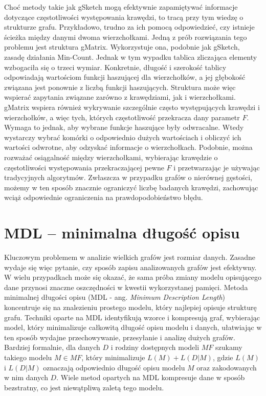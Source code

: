     Choć metody takie jak gSketch mogą efektywnie zapamiętywać informacje dotyczące częstotliwości występowania krawędzi, to tracą przy tym wiedzę o strukturze grafu. Przykładowo, trudno za ich pomocą odpowiedzieć, czy istnieje ścieżka między danymi dwoma wierzchołkami. Jedną z prób rozwiązania tego problemu jest struktura gMatrix\cite{Khan_Aggarwal_2016}. Wykorzystuje ona, podobnie jak gSketch, zasadę działania Min-Count. Jednak w tym wypadku tablica zliczająca elementy wzbogaciła się o trzeci wymiar. Konkretnie, długość i szerokość tablicy odpowiadają wartościom funkcji haszującej dla wierzchołków, a jej głębokość związana jest ponownie z liczbą funkcji haszujących. Struktura może więc wspierać zapytania związane zarówno z krawędziami, jak i wierzchołkami. gMatrix wspiera również wykrywanie szczególnie często występujących krawędzi i wierzchołków, a więc tych, których częstotliwość przekracza dany parametr $F$. Wymaga to jednak, aby wybrane funkcje haszujące były odwracalne. Wtedy wystarczy wybrać komórki o odpowiednio dużych wartościach i obliczyć ich wartości odwrotne, aby odzyskać informacje o wierzchołkach. Podobnie, można rozważać osiągalność między wierzchołkami, wybierając krawędzie o częstotliwości występowania przekraczającej pewne $F$ i przetwarzając je używając tradycyjnych algorytmów. Zwłaszcza w przypadku grafów o nierównej gęstości, możemy w ten sposób znacznie ograniczyć liczbę badanych krawędzi, zachowując wciąż odpowiednie ograniczenia na prawdopodobieństwo błędu.

\section{MDL -- minimalna długość opisu}
    Kluczowym problemem w analizie wielkich grafów jest rozmiar danych. Zasadne wydaje się więc pytanie, czy sposób zapisu analizowanych grafów jest efektywny. W wielu przypadkach może się okazać, że sama próba zmiany modelu opisującego dane przynosi znaczne oszczędności w kwestii wykorzystanej pamięci. Metoda minimalnej długości opisu (MDL - ang. \textit{Minimum Description Length}) koncentruje się na znalezieniu prostego modelu, który najlepiej opisuje strukturę grafu. Techniki oparte na MDL identyfikują wzorce i kompresują graf, wybierając model, który minimalizuje całkowitą długość opisu modelu i danych, ułatwiając w ten sposób wydajne przechowywanie, przesyłanie i analizę dużych grafów. Bardziej formalnie, dla danych $D$ i rodziny dostępnych modeli $MF$ szukamy takiego modelu $M \in MF$, który minimalizuje $L(M) + L(D|M)$, gdzie $L(M)$ i $L(D|M)$ oznaczają odpowiednio długość opisu modelu $M$ oraz zakodowanych w nim danych $D$. Wiele metod opartych na MDL kompresuje dane w sposób bezstratny, co jest niewątpliwą zaletą tego modelu. 

